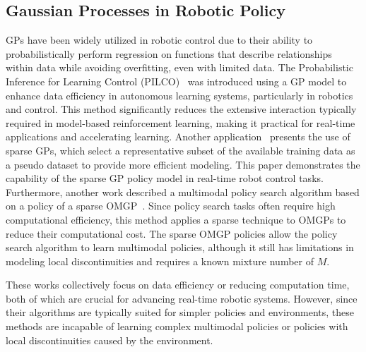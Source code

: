 \documentclass[sn-mathphys-num]{sn-jnl}
\begin{document}
\subsection{Gaussian Processes in Robotic Policy}
GPs have been widely utilized in robotic control due to their ability to probabilistically perform regression on functions that describe relationships within data while avoiding overfitting, even with limited data.
The Probabilistic Inference for Learning Control (PILCO)~\cite{deisenroth2013gaussian} was introduced using a GP model to enhance data efficiency in autonomous learning systems, particularly in robotics and control.
This method significantly reduces the extensive interaction typically required in model-based reinforcement learning, making it practical for real-time applications and accelerating learning.
Another application~\cite{schreiter2015sparse} presents the use of sparse GPs, which select a representative subset of the available training data as a pseudo dataset to provide more efficient modeling. This paper demonstrates the capability of the sparse GP policy model in real-time robot control tasks. 
Furthermore, another work described a multimodal policy search algorithm based on a policy of a sparse OMGP~\cite{sasaki2021variational}. Since policy search tasks often require high computational efficiency, this method applies a sparse technique to OMGPs to reduce their computational cost. The sparse OMGP policies allow the policy search algorithm to learn multimodal policies, although it still has limitations in modeling local discontinuities and requires a known mixture number of $M$.


These works collectively focus on data efficiency or reducing computation time, both of which are crucial for advancing real-time robotic systems.
However, since their algorithms are typically suited for simpler policies and environments, these methods are incapable of learning complex multimodal policies or policies with local discontinuities caused by the environment.
\end{document}
